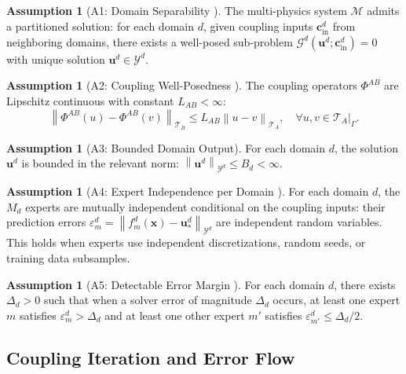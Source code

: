 \documentclass[11pt,a4paper]{article}
\theoremstyle{definition}
\newtheorem{assumption}[theorem]{Assumption}
\newcommand{\norm}[1]{\left\lVert#1\right\rVert}
\newcommand{\interface}{\Gamma}
\begin{document}
\begin{assumption}[A1: Domain Separability ]\label{ass:A1}
The multi-physics system $\mathcal{M}$ admits a partitioned solution: for each domain $d$, given coupling inputs $\mathbf{c}_{\mathrm{in}}^d$ from neighboring domains, there exists a well-posed sub-problem $\mathcal{G}^d(\mathbf{u}^d; \mathbf{c}_{\mathrm{in}}^d) = 0$ with unique solution $\mathbf{u}^d \in \mathcal{Y}^d$.
\end{assumption}

\begin{assumption}[A2: Coupling Well-Posedness ]\label{ass:A2}
The coupling operators $\Phi^{AB}$ are Lipschitz continuous with constant $L_{AB} < \infty$:
\begin{equation}
\norm{\Phi^{AB}(u) - \Phi^{AB}(v)}_{\mathcal{T}_B} \leq L_{AB} \norm{u - v}_{\mathcal{T}_A}, \quad \forall u,v \in \mathcal{T}_A|_\interface.
\end{equation}
\end{assumption}

\begin{assumption}[A3: Bounded Domain Output]\label{ass:A3}
For each domain $d$, the solution $\mathbf{u}^d$ is bounded in the relevant norm: $\norm{\mathbf{u}^d}_{\mathcal{Y}^d} \leq B_d < \infty$.
\end{assumption}

\begin{assumption}[A4: Expert Independence per Domain ]\label{ass:A4}
For each domain $d$, the $M_d$ experts are mutually independent conditional on the coupling inputs: their prediction errors $\varepsilon_m^d = \norm{f_m^d(\mathbf{x}) - \mathbf{u}^d_*}_{\mathcal{Y}^d}$ are independent random variables. This holds when experts use independent discretizations, random seeds, or training data subsamples.
\end{assumption}

\begin{assumption}[A5: Detectable Error Margin ]\label{ass:A5}
For each domain $d$, there exists $\Delta_d > 0$ such that when a solver error of magnitude $\Delta_d$ occurs, at least one expert $m$ satisfies $\varepsilon_m^d > \Delta_d$ and at least one other expert $m'$ satisfies $\varepsilon_{m'}^d \leq \Delta_d/2$.
\end{assumption}

\subsection{Coupling Iteration and Error Flow }
\end{document}
